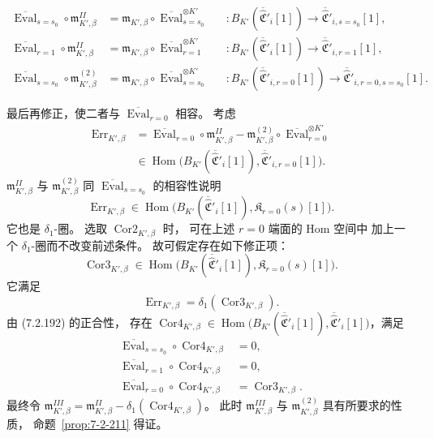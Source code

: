 \[
\begin{aligned}
\overline{\operatorname{Eval}}_{s=s_0}\circ
\mathfrak m^{II}_{K',\beta}
&=\mathfrak m_{K',\beta}\circ
\overline{\operatorname{Eval}}_{s=s_0}^{\otimes K'}
&&\colon B_{K'}(\overline{\widehat{\mathfrak C}}'_i[1])
\to\overline{\widehat{\mathfrak C}}'_{i,s=s_0}[1],\\
\overline{\operatorname{Eval}}_{r=1}\circ
\mathfrak m^{II}_{K',\beta}
&=\mathfrak m_{K',\beta}\circ
\overline{\operatorname{Eval}}_{r=1}^{\otimes K'}
&&\colon B_{K'}(\overline{\widehat{\mathfrak C}}'_i[1])
\to\overline{\widehat{\mathfrak C}}'_{i,r=1}[1],\\
\overline{\operatorname{Eval}}_{s=s_0}\circ
\mathfrak m^{(2)}_{K',\beta}
&=\mathfrak m_{K',\beta}\circ
\overline{\operatorname{Eval}}_{s=s_0}^{\otimes K'}
&&\colon B_{K'}(\overline{\widehat{\mathfrak C}}'_{i,r=0}[1])
\to\overline{\widehat{\mathfrak C}}'_{i,r=0,s=s_0}[1].
\end{aligned}
\]

最后再修正，使二者与
$\overline{\operatorname{Eval}}_{r=0}$ 相容。
考虑
\[
\begin{aligned}
\operatorname{Err}_{K',\beta}
&=\overline{\operatorname{Eval}}_{r=0}\circ
\mathfrak m^{II}_{K',\beta}
-\mathfrak m^{(2)}_{K',\beta}\circ
\overline{\operatorname{Eval}}_{r=0}^{\otimes K'}\\
&\in\operatorname{Hom}\bigl(
B_{K'}(\overline{\widehat{\mathfrak C}}'_i[1]),
\overline{\widehat{\mathfrak C}}'_{i,r=0}[1]
\bigr).
\end{aligned}
\]
$\mathfrak m^{II}_{K',\beta}$ 与
$\mathfrak m^{(2)}_{K',\beta}$
同 $\overline{\operatorname{Eval}}_{s=s_0}$ 的相容性说明
\[
\operatorname{Err}_{K',\beta}
\in\operatorname{Hom}\bigl(
B_{K'}(\overline{\widehat{\mathfrak C}}'_i[1]),
\mathfrak K_{r=0}(s)[1]
\bigr).
\]
它也是 $\delta_1$-圈。
选取 $\operatorname{Cor2}_{K',\beta}$ 时，
可在上述 $r=0$ 端面的 Hom 空间中
加上一个 $\delta_1$-圈而不改变前述条件。
故可假定存在如下修正项：
\[
\operatorname{Cor3}_{K',\beta}\in
\operatorname{Hom}\bigl(
B_{K'}(\overline{\widehat{\mathfrak C}}'_i[1]),
\mathfrak K_{r=0}(s)[1]
\bigr).
\]
它满足
\[
\operatorname{Err}_{K',\beta}
=\delta_1(\operatorname{Cor3}_{K',\beta}).
\]
由 (7.2.192) 的正合性，
存在
$\operatorname{Cor4}_{K',\beta}\in
\operatorname{Hom}\bigl(
B_{K'}(\overline{\widehat{\mathfrak C}}'_i[1]),
\overline{\widehat{\mathfrak C}}'_i[1]
\bigr)$，满足
\[
\begin{aligned}
\overline{\operatorname{Eval}}_{s=s_0}\circ
\operatorname{Cor4}_{K',\beta}&=0,\\
\overline{\operatorname{Eval}}_{r=1}\circ
\operatorname{Cor4}_{K',\beta}&=0,\\
\overline{\operatorname{Eval}}_{r=0}\circ
\operatorname{Cor4}_{K',\beta}
&=\operatorname{Cor3}_{K',\beta}.
\end{aligned}
\]
最终令
$\mathfrak m^{III}_{K',\beta}
=\mathfrak m^{II}_{K',\beta}
-\delta_1(\operatorname{Cor4}_{K',\beta})$。
此时 $\mathfrak m^{III}_{K',\beta}$ 与
$\mathfrak m^{(2)}_{K',\beta}$
具有所要求的性质，
命题~\ref{prop:7-2-211} 得证。
